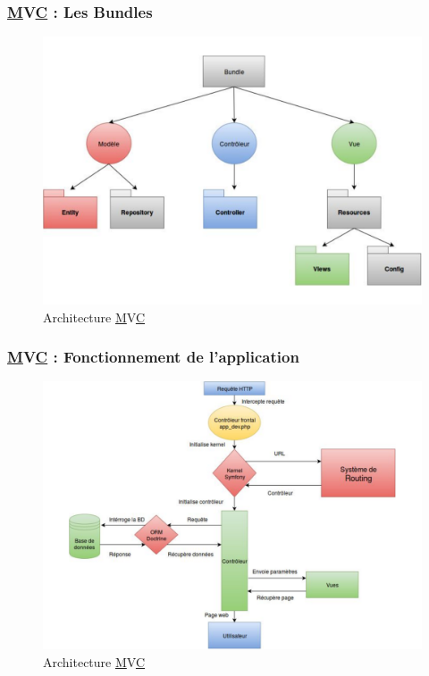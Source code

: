 \speaker{\Florian}

\begin{frame}
  \frametitle{\underline{M}V\underline{C} : Les Bundles}   
\begin{figure}[!h]
	\begin{center}
	\includegraphics[scale=0.3]{images/bundles}
	\caption{Architecture \underline{M}V\underline{C}}
	\end{center}
\end{figure}
\end{frame}


\begin{frame}
  \frametitle{\underline{M}V\underline{C} : Fonctionnement de l'application}
        \begin{figure}[!h]
	\begin{center}
	\includegraphics[scale=0.3]{images/symfony}
	\caption{Architecture \underline{M}V\underline{C}}
	\end{center}
\end{figure}
\end{frame}

